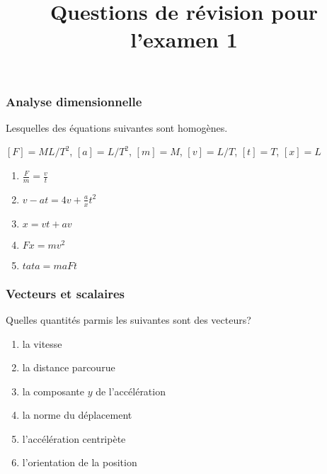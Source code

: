\documentclass{beamer}
\title{Questions de révision pour l'examen 1}
\begin{document}
\maketitle

\begin{frame}
  \frametitle{Analyse dimensionnelle}

  Lesquelles des équations suivantes sont homogènes.

  $[F] = ML/T^2$, $[a] = L/T^2$, $[m] = M$, $[v] = L/T$, $[t] = T$, $[x] = L$

  \begin{enumerate}
    \item \alert<2>{$\displaystyle{\frac{F}{m} = \frac{v}{t} }$}
    \item $\displaystyle{v - at = 4v + \frac{a}{x} t^2  }$
    \item $\displaystyle{x = vt + av}$
    \item \alert<2>{$\displaystyle{Fx = mv^2}$}
    \item $\displaystyle{tata = maFt}$
  \end{enumerate}
\end{frame}


\begin{frame}
  \frametitle{Vecteurs et scalaires}

  Quelles quantités parmis les suivantes sont des vecteurs?

  \begin{enumerate}
    \item \alert<2>{la vitesse}
    \item la distance parcourue
    \item la composante $y$ de l'accélération
    \item la norme du déplacement
    \item \alert<2>{l'accélération centripète}
    \item l'orientation de la position
  \end{enumerate}

\end{frame}
\end{document}
